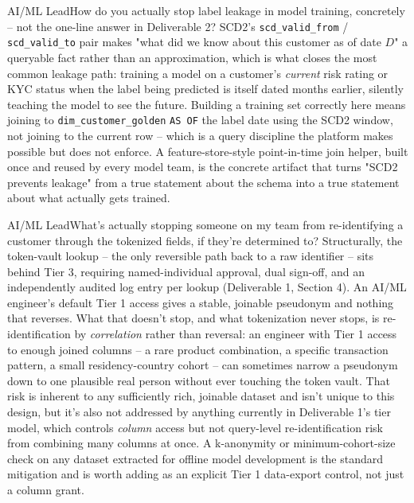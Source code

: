 \documentclass[11pt]{article}
\begin{document}
\begin{stakeholderq}{AI/ML Lead}{How do you actually stop label leakage in model training, concretely -- not the one-line answer in Deliverable 2?}
SCD2's \texttt{scd\_valid\_from} / \texttt{scd\_valid\_to} pair makes "what did we know about this customer as of date $D$" a queryable fact rather than an approximation, which is what closes the most common leakage path: training a model on a customer's \emph{current} risk rating or KYC status when the label being predicted is itself dated months earlier, silently teaching the model to see the future. Building a training set correctly here means joining to \texttt{dim\_customer\_golden} \texttt{AS OF} the label date using the SCD2 window, not joining to the current row -- which is a query discipline the platform makes possible but does not enforce. A feature-store-style point-in-time join helper, built once and reused by every model team, is the concrete artifact that turns "SCD2 prevents leakage" from a true statement about the schema into a true statement about what actually gets trained.
\end{stakeholderq}

\begin{stakeholderq}{AI/ML Lead}{What's actually stopping someone on my team from re-identifying a customer through the tokenized fields, if they're determined to?}
Structurally, the token-vault lookup -- the only reversible path back to a raw identifier -- sits behind Tier 3, requiring named-individual approval, dual sign-off, and an independently audited log entry per lookup (Deliverable 1, Section 4). An AI/ML engineer's default Tier 1 access gives a stable, joinable pseudonym and nothing that reverses. What that doesn't stop, and what tokenization never stops, is re-identification by \emph{correlation} rather than reversal: an engineer with Tier 1 access to enough joined columns -- a rare product combination, a specific transaction pattern, a small residency-country cohort -- can sometimes narrow a pseudonym down to one plausible real person without ever touching the token vault. That risk is inherent to any sufficiently rich, joinable dataset and isn't unique to this design, but it's also not addressed by anything currently in Deliverable 1's tier model, which controls \emph{column} access but not query-level re-identification risk from combining many columns at once. A k-anonymity or minimum-cohort-size check on any dataset extracted for offline model development is the standard mitigation and is worth adding as an explicit Tier 1 data-export control, not just a column grant.
\end{stakeholderq}
\end{document}
